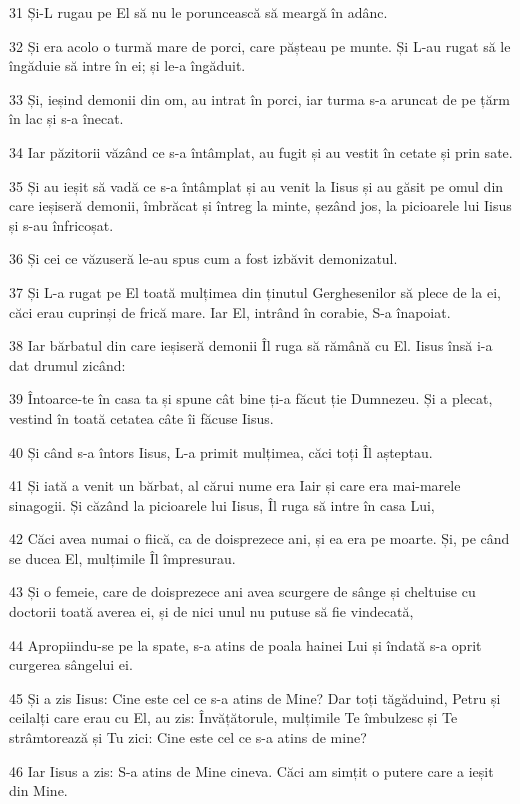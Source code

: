 \par 31 Și-L rugau pe El să nu le poruncească să meargă în adânc.
\par 32 Și era acolo o turmă mare de porci, care pășteau pe munte. Și L-au rugat să le îngăduie să intre în ei; și le-a îngăduit.
\par 33 Și, ieșind demonii din om, au intrat în porci, iar turma s-a aruncat de pe țărm în lac și s-a înecat.
\par 34 Iar păzitorii văzând ce s-a întâmplat, au fugit și au vestit în cetate și prin sate.
\par 35 Și au ieșit să vadă ce s-a întâmplat și au venit la Iisus și au găsit pe omul din care ieșiseră demonii, îmbrăcat și întreg la minte, șezând jos, la picioarele lui Iisus și s-au înfricoșat.
\par 36 Și cei ce văzuseră le-au spus cum a fost izbăvit demonizatul.
\par 37 Și L-a rugat pe El toată mulțimea din ținutul Gerghesenilor să plece de la ei, căci erau cuprinși de frică mare. Iar El, intrând în corabie, S-a înapoiat.
\par 38 Iar bărbatul din care ieșiseră demonii Îl ruga să rămână cu El. Iisus însă i-a dat drumul zicând:
\par 39 Întoarce-te în casa ta și spune cât bine ți-a făcut ție Dumnezeu. Și a plecat, vestind în toată cetatea câte îi făcuse Iisus.
\par 40 Și când s-a întors Iisus, L-a primit mulțimea, căci toți Îl așteptau.
\par 41 Și iată a venit un bărbat, al cărui nume era Iair și care era mai-marele sinagogii. Și căzând la picioarele lui Iisus, Îl ruga să intre în casa Lui,
\par 42 Căci avea numai o fiică, ca de doisprezece ani, și ea era pe moarte. Și, pe când se ducea El, mulțimile Îl împresurau.
\par 43 Și o femeie, care de doisprezece ani avea scurgere de sânge și cheltuise cu doctorii toată averea ei, și de nici unul nu putuse să fie vindecată,
\par 44 Apropiindu-se pe la spate, s-a atins de poala hainei Lui și îndată s-a oprit curgerea sângelui ei.
\par 45 Și a zis Iisus: Cine este cel ce s-a atins de Mine? Dar toți tăgăduind, Petru și ceilalți care erau cu El, au zis: Învățătorule, mulțimile Te îmbulzesc și Te strâmtorează și Tu zici: Cine este cel ce s-a atins de mine?
\par 46 Iar Iisus a zis: S-a atins de Mine cineva. Căci am simțit o putere care a ieșit din Mine.
